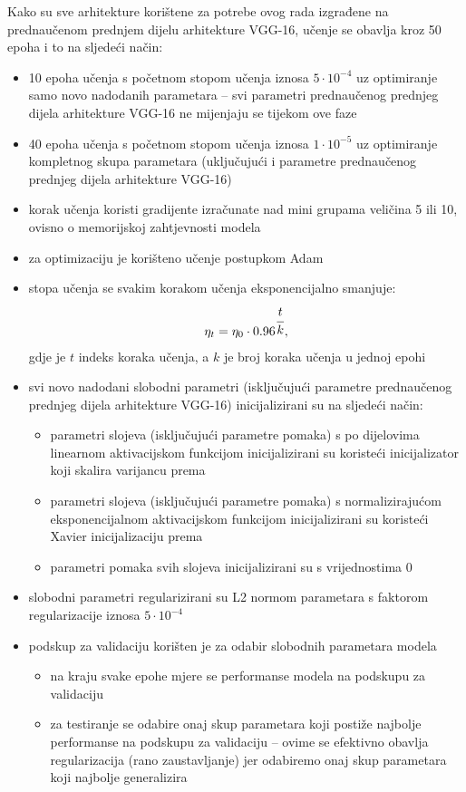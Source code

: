 \documentclass[times, utf8, diplomski, numeric]{fer}
\begin{document}
Kako su sve arhitekture korištene za potrebe ovog rada izgrađene na prednaučenom prednjem dijelu arhitekture VGG-16, učenje se obavlja kroz 50 epoha i to na sljedeći način:
\begin{itemize}
 \item 10 epoha učenja s početnom stopom učenja iznosa $5\cdot10^{-4}$ uz optimiranje samo novo nadodanih parametara -- svi parametri prednaučenog prednjeg dijela arhitekture VGG-16 ne mijenjaju se tijekom ove faze
 \item 40 epoha učenja s početnom stopom učenja iznosa $1\cdot10^{-5}$ uz optimiranje kompletnog skupa parametara (uključujući i parametre prednaučenog prednjeg dijela arhitekture VGG-16)
 \item korak učenja koristi gradijente izračunate nad mini grupama veličina 5 ili 10, ovisno o memorijskoj zahtjevnosti modela
 \item za optimizaciju je korišteno učenje postupkom Adam
 \item stopa učenja se svakim korakom učenja eksponencijalno smanjuje:
 \begin{align}
  \eta_{t}=\eta_0 \cdot 0.96^{\cfrac{t}{k}},
 \end{align}
gdje je $t$ indeks koraka učenja, a $k$ je broj koraka učenja u jednoj epohi
 \item svi novo nadodani slobodni parametri (isključujući parametre prednaučenog prednjeg dijela arhitekture VGG-16) inicijalizirani su na sljedeći način:
 \begin{itemize}
  \item parametri slojeva (isključujući parametre pomaka) s po dijelovima linearnom aktivacijskom funkcijom inicijalizirani su koristeći inicijalizator koji skalira varijancu prema \citep{article:delving_deep_into_rectifiers}
  \item parametri slojeva (isključujući parametre pomaka) s normalizirajućom eksponencijalnom aktivacijskom funkcijom inicijalizirani su koristeći Xavier inicijalizaciju prema \citep{article:delving_deep_into_rectifiers}
  \item parametri pomaka svih slojeva inicijalizirani su s vrijednostima 0
 \end{itemize}

 \item slobodni parametri regularizirani su L2 normom parametara s faktorom regularizacije iznosa $5\cdot10^{-4}$
 \item podskup za validaciju korišten je za odabir slobodnih parametara modela
 \begin{itemize}
  \item na kraju svake epohe mjere se performanse modela na podskupu za validaciju
  \item za testiranje se odabire onaj skup parametara koji postiže najbolje performanse na podskupu za validaciju -- ovime se efektivno obavlja regularizacija (rano zaustavljanje) jer odabiremo onaj skup parametara koji najbolje generalizira
 \end{itemize}
\end{itemize}
\end{document}
